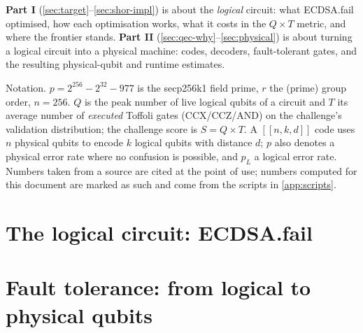 \documentclass[11pt,a4paper]{article}
\newcommand{\ecdsafail}{ECDSA.fail}
\newcommand{\QT}{Q\times T}
\newcommand{\bits}[3]{[\![#1,#2,#3]\!]}
\theoremstyle{plain}
\theoremstyle{definition}
\theoremstyle{remark}
\begin{document}
\begin{keybox}[title={How to read this document}]
\textbf{Part I} (\cref{sec:target}--\cref{sec:shor-impl}) is about the \emph{logical} circuit: what \ecdsafail{} optimised, how each optimisation works, what it costs in the $\QT$ metric, and where the frontier stands. \textbf{Part II} (\cref{sec:qec-why}--\cref{sec:physical}) is about turning a logical circuit into a physical machine: codes, decoders, fault-tolerant gates, and the resulting physical-qubit and runtime estimates.

Notation. $p=2^{256}-2^{32}-977$ is the secp256k1 field prime, $r$ the (prime) group order, $n=256$. $Q$ is the peak number of live logical qubits of a circuit and $T$ its average number of \emph{executed} Toffoli gates (CCX/CCZ/AND) on the challenge's validation distribution; the challenge score is $S=\QT$. A $\bits{n}{k}{d}$ code uses $n$ physical qubits to encode $k$ logical qubits with distance $d$; $p$ also denotes a physical error rate where no confusion is possible, and $p_L$ a logical error rate. Numbers taken from a source are cited at the point of use; numbers computed for this document are marked as such and come from the scripts in \cref{app:scripts}.
\end{keybox}

{\small\setlength{\parskip}{0pt}\tableofcontents}
\clearpage

\part{The logical circuit: \ecdsafail{}}





\clearpage
\part{Fault tolerance: from logical to physical qubits}







\clearpage
\appendix



\clearpage


\end{document}
